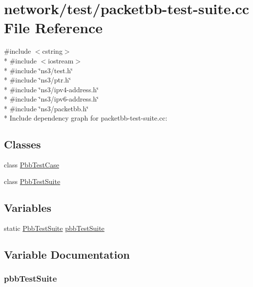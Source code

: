 \hypertarget{packetbb-test-suite_8cc}{}\section{network/test/packetbb-\/test-\/suite.cc File Reference}
\label{packetbb-test-suite_8cc}
{\ttfamily \#include $<$cstring$>$}\\*
{\ttfamily \#include $<$iostream$>$}\\*
{\ttfamily \#include \char`\"{}ns3/test.\+h\char`\"{}}\\*
{\ttfamily \#include \char`\"{}ns3/ptr.\+h\char`\"{}}\\*
{\ttfamily \#include \char`\"{}ns3/ipv4-\/address.\+h\char`\"{}}\\*
{\ttfamily \#include \char`\"{}ns3/ipv6-\/address.\+h\char`\"{}}\\*
{\ttfamily \#include \char`\"{}ns3/packetbb.\+h\char`\"{}}\\*
Include dependency graph for packetbb-\/test-\/suite.cc\+:
\subsection*{Classes}
\begin{DoxyCompactItemize}
\item 
class \hyperlink{classPbbTestCase}{Pbb\+Test\+Case}
\item 
class \hyperlink{classPbbTestSuite}{Pbb\+Test\+Suite}
\end{DoxyCompactItemize}
\subsection*{Variables}
\begin{DoxyCompactItemize}
\item 
static \hyperlink{classPbbTestSuite}{Pbb\+Test\+Suite} \hyperlink{packetbb-test-suite_8cc_a5fd30fb92d0ec51af569f2fb82de6ea9}{pbb\+Test\+Suite}
\end{DoxyCompactItemize}


\subsection{Variable Documentation}
\subsubsection[{\texorpdfstring{pbb\+Test\+Suite}{pbbTestSuite}}]{ pbb\+Test\+Suite\hspace{0.3cm}{\ttfamily [static]}}\hypertarget{packetbb-test-suite_8cc_a5fd30fb92d0ec51af569f2fb82de6ea9}{}\label{packetbb-test-suite_8cc_a5fd30fb92d0ec51af569f2fb82de6ea9}
